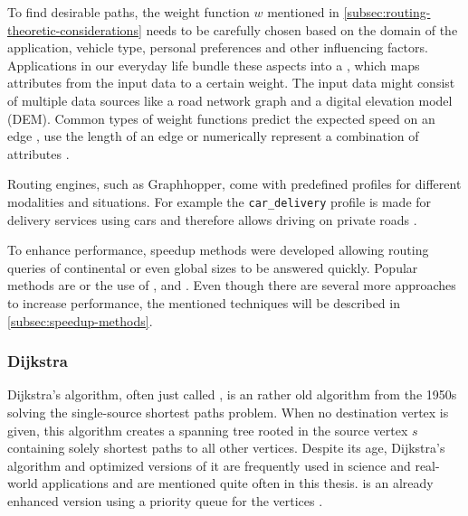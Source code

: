 		To find desirable paths, the weight function $w$ mentioned in \cref{subsec:routing-theoretic-considerations} needs to be carefully chosen based on the domain of the application, vehicle type, personal preferences and other influencing factors.
		Applications in our everyday life bundle these aspects into a , which maps attributes from the input data to a certain weight.
		The input data might consist of multiple data sources like a road network graph and a digital elevation model (DEM).
		Common types of weight functions predict the expected speed on an edge \cite{graphhopper-profile-bike-speeds}, use the length of an edge \cite{graphhopper-profile-shortest} or numerically represent a combination of attributes \cite{graphhopper-profile-short-fastest}.
		
		Routing engines, such as Graphhopper, come with predefined profiles for different modalities and situations.
		For example the \texttt{car\_delivery} profile is made for delivery services using cars and therefore allows driving on private roads \cite{graphhopper-routing-profiles}.
		
		To enhance performance, speedup methods were developed allowing routing queries of continental or even global sizes to be answered quickly.
		Popular methods are  or the use of ,  and .
		Even though there are several more approaches to increase performance, the mentioned techniques will be described in \cref{subsec:speedup-methods}.
		
		\subsubsection{Dijkstra}
		\label{subsubsec:dijkstra}
		
			Dijkstra's algorithm, often just called , is an rather old algorithm from the 1950s solving the single-source shortest paths problem.
			When no destination vertex is given, this algorithm creates a spanning tree rooted in the source vertex $s$ containing solely shortest paths to all other vertices.
			Despite its age, Dijkstra's algorithm and optimized versions of it are frequently used in science and real-world applications and are mentioned quite often in this thesis.
			 is an already enhanced version using a priority queue for the vertices \cite[658]{cormen-introduction-to-alg}.
			
